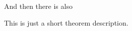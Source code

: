 \documentclass{article}
\newcounter{theorem}
\begin{document}
\lipsum[1]

\begin{theorem}
	\lipsum[2]
\end{theorem}

And then there is also

\begin{theorem}
	This is just a short theorem description.
\end{theorem}

\lipsum[3]
\end{document}
